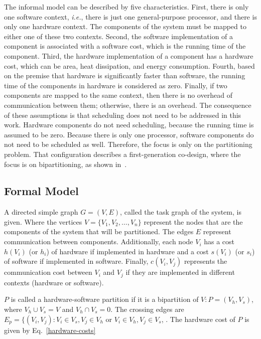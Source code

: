 \documentclass{doublecol-new}
\theoremstyle{TH}{
\newtheorem{lemma}{Lemma}
\newtheorem{theorem}[lemma]{Theorem}
\newtheorem{corrolary}[lemma]{Corrolary}
\newtheorem{conjecture}[lemma]{Conjecture}
\newtheorem{proposition}[lemma]{Proposition}
\newtheorem{claim}[lemma]{Claim}
\newtheorem{stheorem}[lemma]{Wrong Theorem}
\newtheorem{algorithm}{Algorithm}
}
\theoremstyle{THrm}{
\newtheorem{definition}{Definition}[section]
\newtheorem{question}{Question}[section]
\newtheorem{remark}{Remark}
\newtheorem{scheme}{Scheme}
}
\theoremstyle{THhit}{
\newtheorem{case}{Case}[section]
}
\begin{document}
The informal model can be described by five characteristics. First, there is only one software context, {\it i.e.}, there is just one general-purpose processor, and there is only one hardware context. The components of the system must be mapped to either one of these two contexts. Second, the software implementation of a component is associated with a software cost, which is the running time of the component. Third, the hardware implementation of a component has a hardware cost, which can be area, heat dissipation, and energy consumption. Fourth, based on the premise that hardware is significantly faster than software, the running time of the components in hardware is considered as zero. Finally, if two components are mapped to the same context, then there is no overhead of communication between them; otherwise, there is an overhead. The consequence of these assumptions is that scheduling does not need to be addressed in this work. Hardware components do not need scheduling, because the running time is assumed to be zero. Because there is only one processor, software components do not need to be scheduled as well. Therefore, the focus is only on the partitioning problem. That configuration describes a first-generation co-design, where the focus is on bipartitioning, as shown in~\cite{Teich2012}.

\subsection{Formal Model}
\label{Formal-Model}

A directed simple graph $ G = (V,E) $, called the task graph of the system, is given. Where the vertices $V = \{V_1,V_2,\dotso,V_n\}$ represent the nodes that are the components of the system that will be partitioned. The edges $E$ represent communication between components. Additionally, each node  $V_i$ has a cost $h(V_i)$ (or $h_i$) of hardware if implemented in hardware and a cost $s(V_i)$ (or $ s_i $) of software if implemented in software. Finally, $c(V_i,V_j)$ represents the communication cost between $V_i$ and $V_j$ if they are implemented in different contexts (hardware or software).

$P$ is called a hardware-software partition if it is a bipartition of $V:P = (V_h, V_s)$, where $V_h \cup V_s = V$  and $V_h \cap V_s = 0$. The crossing edges are $E_p = \{(V_i,V_j):V_i \in V_s, V_j \in V_h$ or $V_i \in V_h, V_j \in V_s $, \cite{Arato2003}. The hardware cost of $P$ is given by Eq.~\eqref{hardware-costs}
\end{document}
